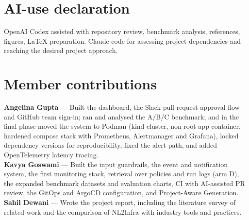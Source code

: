 \documentclass[12pt,onecolumn,draftclsnofoot]{IEEEtran}
\begin{document}
\section*{AI-use declaration}
OpenAI Codex assisted with repository review, benchmark analysis, references, figures, LaTeX preparation. Claude code for assessing project dependencies and reaching the desired project approach.

\section*{Member contributions}
\noindent\textbf{Angelina Gupta} --- Built the dashboard, the Slack pull-request approval flow and GitHub team sign-in; ran and analysed the A/B/C benchmark; and in the final phase moved the system to Podman (kind cluster, non-root app container, hardened compose stack with Prometheus, Alertmanager and Grafana), locked dependency versions for reproducibility, fixed the alert path, and added OpenTelemetry latency tracing.\\
\textbf{Kavya Goswami} --- Built the input guardrails, the event and notification system, the first monitoring stack, retrieval over policies and run logs (arm D), the expanded benchmark datasets and evaluation charts, CI with AI-assisted PR review, the GitOps and ArgoCD configuration, and Project-Aware Generation.\\
\textbf{Sahil Dewani} --- Wrote the project report, including the literature survey of related work and the comparison of NL2Infra with industry tools and practices.



\end{document}
